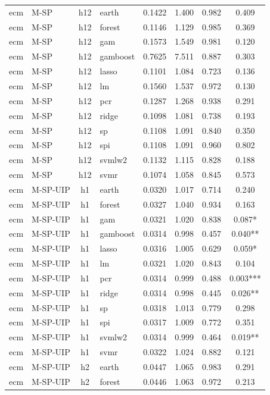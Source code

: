 \begin{ThreePartTable}
\begin{longtable}[t]{llclcccc}
\addlinespace
ecm & M-SP & h12 & earth & 0.1422 & 1.400 & 0.982 & 0.409\\
ecm & M-SP & h12 & forest & 0.1146 & 1.129 & 0.985 & 0.369\\
ecm & M-SP & h12 & gam & 0.1573 & 1.549 & 0.981 & 0.120\\
ecm & M-SP & h12 & gamboost & 0.7625 & 7.511 & 0.887 & 0.303\\
ecm & M-SP & h12 & lasso & 0.1101 & 1.084 & 0.723 & 0.136\\
ecm & M-SP & h12 & lm & 0.1560 & 1.537 & 0.972 & 0.130\\
ecm & M-SP & h12 & pcr & 0.1287 & 1.268 & 0.938 & 0.291\\
ecm & M-SP & h12 & ridge & 0.1098 & 1.081 & 0.738 & 0.193\\
ecm & M-SP & h12 & sp & 0.1108 & 1.091 & 0.840 & 0.350\\
ecm & M-SP & h12 & spi & 0.1108 & 1.091 & 0.960 & 0.802\\
ecm & M-SP & h12 & svmlw2 & 0.1132 & 1.115 & 0.828 & 0.188\\
ecm & M-SP & h12 & svmr & 0.1074 & 1.058 & 0.845 & 0.573\\
\addlinespace
ecm & M-SP-UIP & h1 & earth & 0.0320 & 1.017 & 0.714 & 0.240\\
ecm & M-SP-UIP & h1 & forest & 0.0327 & 1.040 & 0.934 & 0.163\\
ecm & M-SP-UIP & h1 & gam & 0.0321 & 1.020 & 0.838 & 0.087*\\
ecm & M-SP-UIP & h1 & gamboost & 0.0314 & 0.998 & 0.457 & 0.040**\\
ecm & M-SP-UIP & h1 & lasso & 0.0316 & 1.005 & 0.629 & 0.059*\\
ecm & M-SP-UIP & h1 & lm & 0.0321 & 1.020 & 0.843 & 0.104\\
ecm & M-SP-UIP & h1 & pcr & 0.0314 & 0.999 & 0.488 & 0.003***\\
ecm & M-SP-UIP & h1 & ridge & 0.0314 & 0.998 & 0.445 & 0.026**\\
ecm & M-SP-UIP & h1 & sp & 0.0318 & 1.013 & 0.779 & 0.298\\
ecm & M-SP-UIP & h1 & spi & 0.0317 & 1.009 & 0.772 & 0.351\\
ecm & M-SP-UIP & h1 & svmlw2 & 0.0314 & 0.999 & 0.464 & 0.019**\\
ecm & M-SP-UIP & h1 & svmr & 0.0322 & 1.024 & 0.882 & 0.121\\
\addlinespace
ecm & M-SP-UIP & h2 & earth & 0.0447 & 1.065 & 0.983 & 0.291\\
ecm & M-SP-UIP & h2 & forest & 0.0446 & 1.063 & 0.972 & 0.213\\

\end{longtable}
\end{ThreePartTable}
